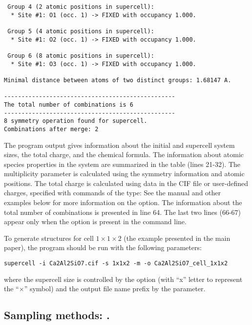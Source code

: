 \documentclass[a4paper,10pt]{article}
\begin{document}
\begin{verbatim}
 Group 4 (2 atomic positions in supercell):
  * Site #1: O1 (occ. 1) -> FIXED with occupancy 1.000.

 Group 5 (4 atomic positions in supercell):
  * Site #1: O2 (occ. 1) -> FIXED with occupancy 1.000.

 Group 6 (8 atomic positions in supercell):
  * Site #1: O3 (occ. 1) -> FIXED with occupancy 1.000.

Minimal distance between atoms of two distinct groups: 1.68147 A.

-------------------------------------------------
The total number of combinations is 6
-------------------------------------------------
8 symmetry operation found for supercell.
Combinations after merge: 2
\end{verbatim}

The program output gives information about the initial and supercell system sizes, the total charge, and the chemical formula. The information about atomic species properties in the system are summarized in the table (lines 21-32). The multiplicity parameter is calculated using the symmetry information and atomic positions. The total charge is calculated using  data in the CIF file or user-defined charges, specified with commands of the type:
See the manual and other examples below for more information on the  option. The information about the total number of combinations is presented in line 64. The last two lines (66-67) appear only when the  option is present in the command line. 

To generate structures for cell $1\times1\times2$ (the example presented in the main paper), the \sups{} program should be run with the following parameters:
\begin{Verbatim}[breaklines]
supercell -i Ca2Al2SiO7.cif -s 1x1x2 -m -o Ca2Al2SiO7_cell_1x1x2
\end{Verbatim}
where the supercell size is controlled by the  option (with ``x'' letter to represent the ``$\times$'' symbol) and the output file name prefix by the  parameter.

\subsection*{Sampling methods: .}
\end{document}
